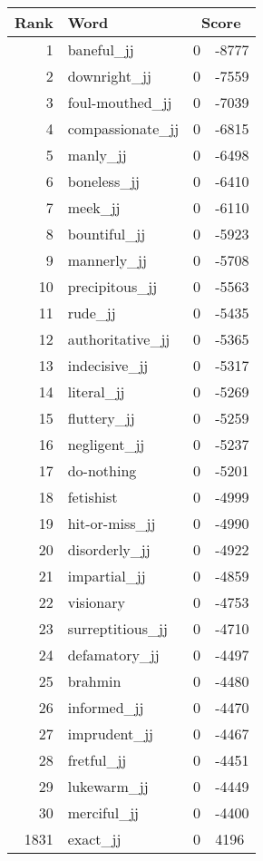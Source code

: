 \begin{longtable}[!htbp]{| rlr@{.}l |}
    \hline
    \textbf{Rank} & \textbf{Word} & \multicolumn{2}{c|}{\textbf{Score}} \\
    \hline
    \endhead
    1 & baneful\_jj & 0 & -8777 \\
    2 & downright\_jj & 0 & -7559 \\
    3 & foul-mouthed\_jj & 0 & -7039 \\
    4 & compassionate\_jj & 0 & -6815 \\
    5 & manly\_jj & 0 & -6498 \\
    6 & boneless\_jj & 0 & -6410 \\
    7 & meek\_jj & 0 & -6110 \\
    8 & bountiful\_jj & 0 & -5923 \\
    9 & mannerly\_jj & 0 & -5708 \\
    10 & precipitous\_jj & 0 & -5563 \\
    11 & rude\_jj & 0 & -5435 \\
    12 & authoritative\_jj & 0 & -5365 \\
    13 & indecisive\_jj & 0 & -5317 \\
    14 & literal\_jj & 0 & -5269 \\
    15 & fluttery\_jj & 0 & -5259 \\
    16 & negligent\_jj & 0 & -5237 \\
    17 & do-nothing & 0 & -5201 \\
    18 & fetishist & 0 & -4999 \\
    19 & hit-or-miss\_jj & 0 & -4990 \\
    20 & disorderly\_jj & 0 & -4922 \\
    21 & impartial\_jj & 0 & -4859 \\
    22 & visionary & 0 & -4753 \\
    23 & surreptitious\_jj & 0 & -4710 \\
    24 & defamatory\_jj & 0 & -4497 \\
    25 & brahmin & 0 & -4480 \\
    26 & informed\_jj & 0 & -4470 \\
    27 & imprudent\_jj & 0 & -4467 \\
    28 & fretful\_jj & 0 & -4451 \\
    29 & lukewarm\_jj & 0 & -4449 \\
    30 & merciful\_jj & 0 & -4400 \\
    1831 & exact\_jj & 0 & 4196 \\

\end{longtable}
